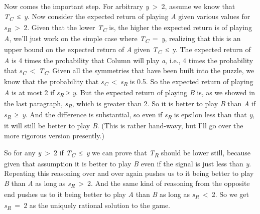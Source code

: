 \documentclass[
  12pt,
  letterpaper,
]{scrbook}
\begin{document}
Now comes the important step. For arbitrary \emph{y}~\textgreater~2,
assume we know that \emph{T\textsubscript{C}}~≤~\emph{y}. Now consider
the expected return of playing \emph{A} given various values for
\emph{s\textsubscript{R}}~\textgreater~2. Given that the lower
\emph{T\textsubscript{C}} is, the higher the expected return is of
playing \emph{A}, we'll just work on the simple case where
\emph{T\textsubscript{C}}~=~\emph{y}, realizing that this is an upper
bound on the expected return of \emph{A} given
\emph{T\textsubscript{C}}~≤~y. The expected return of \emph{A} is 4
times the probability that Column will play \emph{a}, i.e., 4 times the
probability that
\emph{s\textsubscript{C}}~\textless~\emph{T\textsubscript{C}}. Given all
the symmetries that have been built into the puzzle, we know that the
probability that
\emph{s\textsubscript{C}}~\textless~\emph{s\textsubscript{R}} is 0.5. So
the expected return of playing \emph{A} is at most 2 if
\emph{s\textsubscript{R}} ≥ \emph{y}. But the expected return of playing
\emph{B} is, as we showed in the last paragraph,
\emph{s\textsubscript{R}}, which is greater than 2. So it is better to
play \emph{B} than \emph{A} if \emph{s\textsubscript{R}}~≥~\emph{y}. And
the difference is substantial, so even if \emph{s\textsubscript{R}} is
epsilon less than that \emph{y}, it will still be better to play
\emph{B}. (This is rather hand-wavy, but I'll go over the more rigorous
version presently.)

So for any \emph{y}~\textgreater~2 if
\emph{T\textsubscript{C}}~≤~\emph{y} we can prove that
\emph{T\textsubscript{R}} should be lower still, because given that
assumption it is better to play \emph{B} even if the signal is just less
than \emph{y}. Repeating this reasoning over and over again pushes us to
it being better to play \emph{B} than \emph{A} as long as
\emph{s\textsubscript{R}}~\textgreater~2. And the same kind of reasoning
from the opposite end pushes us to it being better to play \emph{A} than
\emph{B} as long as \emph{s\textsubscript{R}}~\textless~2. So we get
\emph{s\textsubscript{R}}~=~2 as the uniquely rational solution to the
game.
\end{document}
